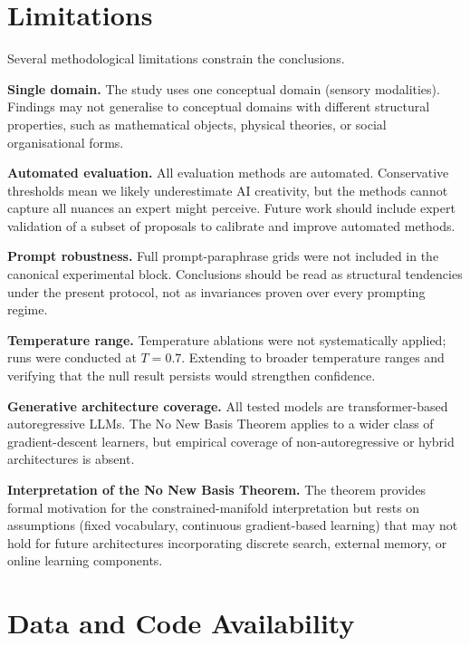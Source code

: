 \documentclass[pdflatex,sn-mathphys-num]{sn-jnl}
\begin{document}
\section{Limitations}
\label{sec:limits}

Several methodological limitations constrain the conclusions.

\textbf{Single domain.}  The study uses one conceptual domain (sensory modalities).  Findings
may not generalise to conceptual domains with different structural properties, such as
mathematical objects, physical theories, or social organisational forms.

\textbf{Automated evaluation.}  All evaluation methods are automated.  Conservative thresholds
mean we likely underestimate AI creativity, but the methods cannot capture all nuances an expert
might perceive.  Future work should include expert validation of a subset of proposals to
calibrate and improve automated methods.

\textbf{Prompt robustness.}  Full prompt-paraphrase grids were not included in the canonical
experimental block.  Conclusions should be read as structural tendencies under the present
protocol, not as invariances proven over every prompting regime.

\textbf{Temperature range.}  Temperature ablations were not systematically applied; 
runs were conducted at $T=0.7$.  Extending to broader temperature ranges and verifying that the
null result persists would strengthen confidence.

\textbf{Generative architecture coverage.}  All tested models are transformer-based
autoregressive LLMs.  The No New Basis Theorem applies to a wider class of gradient-descent
learners, but empirical coverage of non-autoregressive or hybrid architectures is absent.

\textbf{Interpretation of the No New Basis Theorem.}  The theorem provides formal motivation
for the constrained-manifold interpretation but rests on assumptions (fixed vocabulary,
continuous gradient-based learning) that may not hold for future architectures incorporating
discrete search, external memory, or online learning components.

\section{Data and Code Availability}
\label{sec:data}
\end{document}
